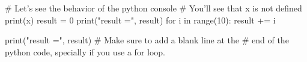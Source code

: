 \documentclass[11pt]{article}%
\begin{document}
\vspace{5em}

\begin{pyconsole}
# Let's see the behavior of the python console
# You'll see that x is not defined
print(x)
result = 0
print("result =", result)
for i in range(10):
    result += i

print("result =", result)
# Make sure to add a blank line at the 
# end of the python code, specially if you use a for loop.
\end{pyconsole}
\end{document}
